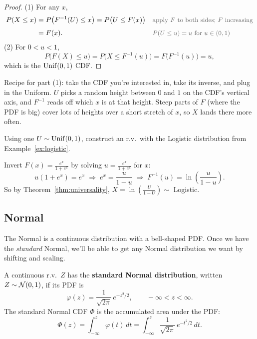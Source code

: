 \begin{proof}
  (1) For any $x$,
  \begin{align*}
    P(X \le x)
      &= P\bigl(F^{-1}(U) \le x\bigr)
       = P\bigl(U \le F(x)\bigr)
      && \by{apply $F$ to both sides; $F$ increasing} \\[0.4em]
      &= F(x).
      && \by{$P(U \le u) = u$ for $u \in (0, 1)$}
  \end{align*}
  (2) For $0 < u < 1$,
  \[
    P\bigl(F(X) \le u\bigr) = P\bigl(X \le F^{-1}(u)\bigr) = F\bigl(F^{-1}(u)\bigr) = u,
  \]
  which is the $\operatorname{Unif}(0, 1)$ CDF.
\end{proof}

\begin{intuition}
  Recipe for part (1): take the CDF you're interested in, take its inverse, and plug in the Uniform. $U$ picks a random height between $0$ and $1$ on the CDF's vertical axis, and $F^{-1}$ reads off which $x$ is at that height. Steep parts of $F$ (where the PDF is big) cover lots of heights over a short stretch of $x$, so $X$ lands there more often.
\end{intuition}

\begin{example}
  Using one $U \sim \operatorname{Unif}(0, 1)$, construct an r.v.\ with the Logistic distribution from Example~\ref{ex:logistic}.
\end{example}

\begin{solution}
  Invert $F(x) = \frac{e^{x}}{1 + e^{x}}$ by solving $u = \frac{e^{x}}{1 + e^{x}}$ for $x$:
  \[
    u(1 + e^{x}) = e^{x}
    \;\Longrightarrow\;
    e^{x} = \frac{u}{1 - u}
    \;\Longrightarrow\;
    F^{-1}(u) = \ln\!\left(\frac{u}{1 - u}\right).
  \]
  So by Theorem~\ref{thm:universality}, $X = \ln\!\left(\frac{U}{1 - U}\right) \sim$ Logistic.
\end{solution}

\subsection{Normal}

The Normal is a continuous distribution with a bell-shaped PDF. Once we have the \emph{standard} Normal, we'll be able to get any Normal distribution we want by shifting and scaling.

\begin{definition}\label{def:stdnormal}
  A continuous r.v.\ $Z$ has the \textbf{standard Normal distribution}, written $Z \sim \mathcal{N}(0, 1)$, if its PDF is
  \[
    \varphi(z) = \frac{1}{\sqrt{2\pi}}\, e^{-z^{2}/2}, \qquad -\infty < z < \infty.
  \]
  The standard Normal CDF $\Phi$ is the accumulated area under the PDF:
  \[
    \Phi(z) = \int_{-\infty}^{z} \varphi(t)\,dt = \int_{-\infty}^{z} \frac{1}{\sqrt{2\pi}}\, e^{-t^{2}/2}\,dt.
  \]
\end{definition}


